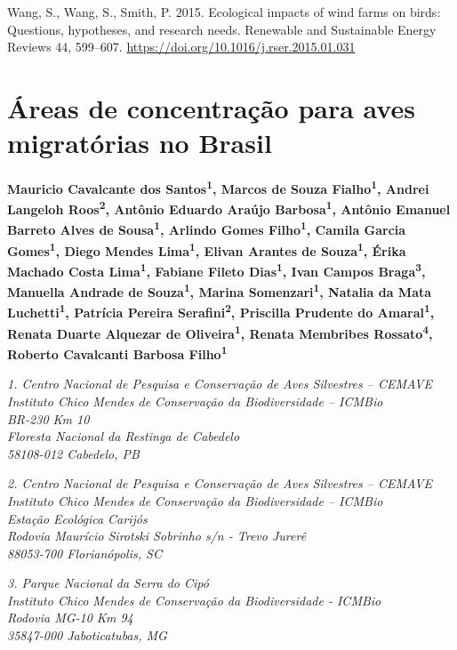 \documentclass[
  oneside]{scrbook}
\begin{document}
Wang, S., Wang, S., Smith, P. 2015. Ecological impacts of wind farms on birds: Questions, hypotheses, and research needs. Renewable and Sustainable Energy Reviews 44, 599--607. \url{https://doi.org/10.1016/j.rser.2015.01.031}

\hypertarget{cap7}{%
\chapter{Áreas de concentração para aves migratórias no Brasil}\label{cap7}}

\pagestyle{headings}

\textbf{Mauricio Cavalcante dos Santos\textsuperscript{1}, Marcos de Souza Fialho\textsuperscript{1}, Andrei Langeloh Roos\textsuperscript{2}, Antônio Eduardo Araújo Barbosa\textsuperscript{1}, Antônio Emanuel Barreto Alves de Sousa\textsuperscript{1}, Arlindo Gomes Filho\textsuperscript{1}, Camila Garcia Gomes\textsuperscript{1}, Diego Mendes Lima\textsuperscript{1}, Elivan Arantes de Souza\textsuperscript{1}, Érika Machado Costa Lima\textsuperscript{1}, Fabiane Fileto Dias\textsuperscript{1}, Ivan Campos Braga\textsuperscript{3}, Manuella Andrade de Souza\textsuperscript{1}, Marina Somenzari\textsuperscript{1}, Natalia da Mata Luchetti\textsuperscript{1}, Patrícia Pereira Serafini\textsuperscript{2}, Priscilla Prudente do Amaral\textsuperscript{1}, Renata Duarte Alquezar de Oliveira\textsuperscript{1}, Renata Membribes Rossato\textsuperscript{4}, Roberto Cavalcanti Barbosa Filho\textsuperscript{1}}

\emph{1. Centro Nacional de Pesquisa e Conservação de Aves Silvestres -- CEMAVE}\\
\emph{Instituto Chico Mendes de Conservação da Biodiversidade -- ICMBio}\\
\emph{BR-230 Km 10}\\
\emph{Floresta Nacional da Restinga de Cabedelo}\\
\emph{58108-012 Cabedelo, PB}

\emph{2. Centro Nacional de Pesquisa e Conservação de Aves Silvestres -- CEMAVE}\\
\emph{Instituto Chico Mendes de Conservação da Biodiversidade -- ICMBio}\\
\emph{Estação Ecológica Carijós}\\
\emph{Rodovia Maurício Sirotski Sobrinho s/n - Trevo Jurerê}\\
\emph{88053-700 Florianópolis, SC}

\emph{3. Parque Nacional da Serra do Cipó}\\
\emph{Instituto Chico Mendes de Conservação da Biodiversidade - ICMBio}\\
\emph{Rodovia MG-10 Km 94}\\
\emph{35847-000 Jaboticatubas, MG}
\end{document}
